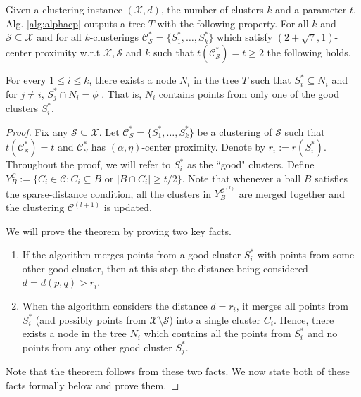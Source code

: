 \documentclass[anon,12pt]{colt2016} %
\newcommand{\mc}{\mathcal}
\begin{document}
\begin{theorem}
\label{thm:alphacpnoise}
Given a clustering instance $(\mc X, d)$, the number of clusters $k$ and a parameter $t$, Alg. \ref{alg:alphacp} outputs a tree $T$ with the following property. For all $k$ and $\mc S \subseteq \mc X$ and for all $k$-clusterings $\mc C^*_{\mc S} = \{S_1^*, \ldots, S_k^*\}$ which satisfy $(2+\sqrt{7}, 1)$-center proximity w.r.t $\mc X, \mc S$ and $k$ such that $t(\mc C_{\mc S}^*) = t \ge 2$ the following holds. 

For every $1\le i \le k$, there exists a node $N_i$ in the tree $T$ such that $S_i^* \subseteq N_i$ and for $j \neq i$, $S_j^* \cap N_i = \phi$ . That is, $N_i$ contains points from only one of the good clusters $S_i^*$.
\end{theorem}

\begin{proof}
Fix any $\mc S \subseteq \mc X$. Let $\mc C^*_S = \{S_1^*, \ldots, S_k^*\}$ be a clustering of $\mc S$ such that $t(\mc C_{\mc S}^*) = t$ and $\mc C^*_S$ has $(\alpha, \eta)$-center proximity. Denote by $r_i := r(S_i^*)$. Throughout the proof, we will refer to $S_i^*$ as the ``good" clusters. Define $Y_B^{\mc C} := \{C_i \in \mc C : C_i \subseteq B \text{ or } |B \cap C_i| \ge t/2\}$. Note that whenever a ball $B$ satisfies the sparse-distance condition, all the clusters in $Y_{B}^{{\mc C}^{(l)}}$ are merged together and the clustering $\mc C^{(l+1)}$ is updated.

\noindent We will prove the theorem by proving two key facts.

\begin{enumerate}[nolistsep, noitemsep, label=\textbf{F.\arabic*}]
\renewcommand\labelitemi{$\diamond$}
\item \label{fact:1} If the algorithm merges points from a good cluster $S_i^*$ with points from some other good cluster,  then at this step the distance being considered $d = d(p,q) > r_i$.	
\item \label{fact:2} When the algorithm considers the distance $d = r_i$, it merges all points from $S_i^*$ (and possibly points from $\mc X\setminus \mc S$) into a single cluster $C_i$. Hence, there exists a node in the tree $N_i$ which contains all the points from $S_i^*$ and no points from any other good cluster $S_j^*$. 	
\end{enumerate}
Note that the theorem follows from these two facts. We now state both of these facts formally below and prove them.


\end{proof}
\end{document}
